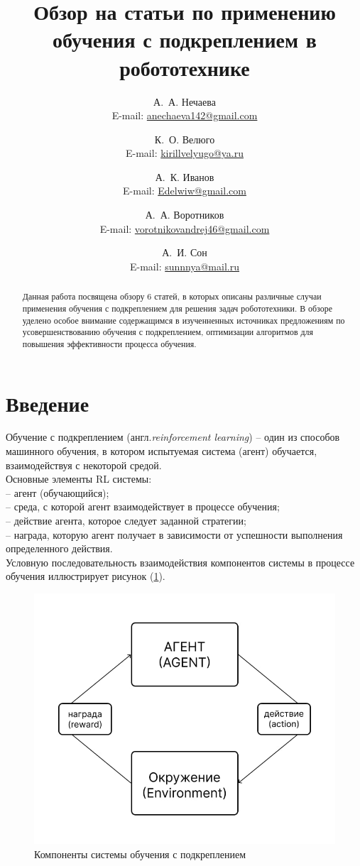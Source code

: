 \documentclass[12 pt, a4paper]{article}
\title{\large{Обзор на статьи по применению обучения с подкреплением в робототехнике}}
\author{А.~А. Нечаева \\ E-mail: \href{mailto:anechaeva142@gmail.com}{ anechaeva142@gmail.com}
 \and  К.~О. Велюго \\ E-mail: \href{mailto:kirillvelyugo@ya.ru}{kirillvelyugo@ya.ru} 
\and А.~К. Иванов   \\ E-mail: \href{mailto:Edelwiw@gmail.com}{Edelwiw@gmail.com} 
 \and А.~А.  Воротников  \\ E-mail: \href{mailto:vorotnikovandrej46@gmail.com}{vorotnikovandrej46@gmail.com} 
 \and А.~И. Сон  \\ E-mail: \href{mailto:sunnnya@mail.ru}{sunnnya@mail.ru} }
\date{}
\theoremstyle{definition}
\theoremstyle{plain}
\theoremstyle{remark}
\begin{document}
\maketitle
\pagestyle{plain}
\begin{abstract}
Данная работа посвящена обзору 6 статей, в которых описаны различные случаи применения обучения с подкреплением для решения задач робототехники. В обзоре уделено особое внимание содержащимся в изученненных источниках предложениям по усовершенствованию обучения с подкреплением, оптимизации алгоритмов для повышения эффективности процесса обучения. 
\end{abstract}
\section{Введение}
Обучение с подкреплением (англ.\textit{reinforcement learning}) -- один из способов машинного обучения, в котором испытуемая система (агент) обучается, взаимодействуя с некоторой средой. \\
Основные элементы RL системы:\\
-- агент (обучающийся);\\
-- среда, с которой агент взаимодействует в процессе обучения;\\
-- действие агента, которое следует заданной стратегии;\\
-- награда, которую агент получает в зависимости от успешности выполнения определенного действия.\\
Условную последовательность взаимодействия компонентов системы в процессе обучения иллюстрирует рисунок (\ref{ris:1}).
\begin{figure}[h]
		\begin{center}
                      \includegraphics[scale=0.5]{"./РЛ_компоненты.jpg"}
	           \caption{Компоненты системы обучения с подкреплением}\label{ris:1}
		\end{center}
\end{figure}\\
\end{document}

